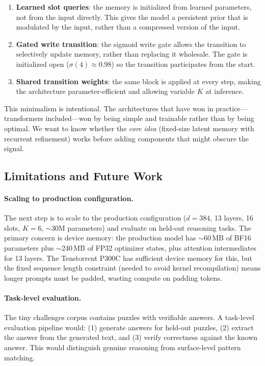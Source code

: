 \documentclass[11pt,a4paper]{article}
\begin{document}
\begin{enumerate}[nosep]
    \item \textbf{Learned slot queries}: the memory is initialized from learned parameters, not from the input directly. This gives the model a persistent prior that is modulated by the input, rather than a compressed version of the input.
    \item \textbf{Gated write transition}: the sigmoid write gate allows the transition to selectively update memory, rather than replacing it wholesale. The gate is initialized open ($\sigma(4) \approx 0.98$) so the transition participates from the start.
    \item \textbf{Shared transition weights}: the same block is applied at every step, making the architecture parameter-efficient and allowing variable $K$ at inference.
\end{enumerate}

This minimalism is intentional. The architectures that have won in practice---transformers included---won by being simple and trainable rather than by being optimal. We want to know whether the \emph{core idea} (fixed-size latent memory with recurrent refinement) works before adding components that might obscure the signal.

\subsection{Limitations and Future Work}

\paragraph{Scaling to production configuration.}
The next step is to scale to the production configuration ($d{=}384$, 13 layers, 16 slots, $K{=}6$, $\sim$30M parameters) and evaluate on held-out reasoning tasks. The primary concern is device memory: the production model has $\sim$60\,MB of BF16 parameters plus $\sim$240\,MB of FP32 optimizer states, plus attention intermediates for 13 layers. The Tenstorrent P300C has sufficient device memory for this, but the fixed sequence length constraint (needed to avoid kernel recompilation) means longer prompts must be padded, wasting compute on padding tokens.

\paragraph{Task-level evaluation.}
The tiny challenges corpus contains puzzles with verifiable answers. A task-level evaluation pipeline would: (1) generate answers for held-out puzzles, (2) extract the answer from the generated text, and (3) verify correctness against the known answer. This would distinguish genuine reasoning from surface-level pattern matching.
\end{document}

